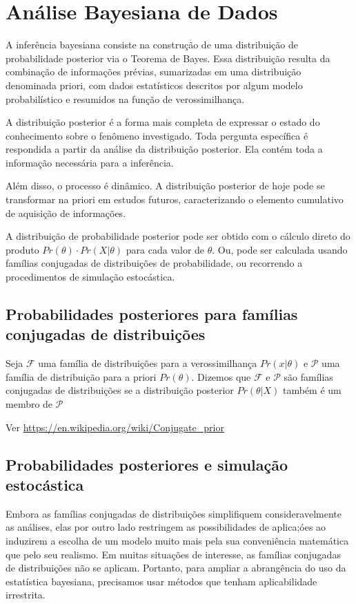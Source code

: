 \section{Análise Bayesiana de Dados}

A inferência bayesiana consiste na construção de uma distribuição de probabilidade posterior via o Teorema de Bayes. Essa distribuição resulta da combinação de informações prévias, sumarizadas em uma distribuição denominada priori, com dados estatísticos descritos por algum modelo probabilístico e resumidos na função de verossimilhança.

A distribuição posterior é a forma mais completa de expressar o estado do conhecimento sobre o fenômeno investigado. Toda pergunta específica é respondida a partir da análise da distribuição posterior. Ela contém toda a informação necessária para a inferência.

Além disso, o processo é dinâmico. A distribuição posterior de hoje pode se transformar na priori em estudos futuros, caracterizando o elemento cumulativo de aquisição de informações.

A distribuição de probabilidade posterior pode ser obtido com o cálculo direto do produto $Pr(\theta) \cdot Pr(X | \theta)$ para cada valor de $\theta$. Ou, pode ser calculada usando famílias conjugadas de distribuições de probabilidade, ou recorrendo a procedimentos de simulação estocástica.

\subsection{Probabilidades posteriores para famílias conjugadas de distribuições}

Seja $\mathcal{F}$ uma família de distribuições para a verossimilhança $Pr(x | \theta)$ e $\mathcal{P}$ uma família de distribuição para a priori $Pr(\theta)$. Dizemos que $\mathcal{F}$ e $\mathcal{P}$ são famílias conjugadas de distribuições se a distribuição posterior $Pr(\theta|X)$ também é um membro de $\mathcal{P}$

Ver \url{https://en.wikipedia.org/wiki/Conjugate_prior}

\subsection{Probabilidades posteriores e simulação estocástica}

Embora as famílias conjugadas de distribuições simplifiquem consideravelmente as análises, elas por outro lado restringem as possibilidades de aplica;óes ao induzirem a escolha de um modelo muito mais pela sua conveniência matemática que pelo seu realismo. Em muitas situações de interesse, as famílias conjugadas de distribuições não se aplicam. Portanto, para ampliar a abrangência do uso da estatística bayesiana, precisamos usar métodos que tenham aplicabilidade irrestrita.

